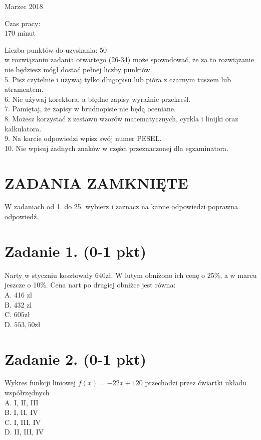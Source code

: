 \documentclass[10pt]{article}
\begin{document}
Marzec 2018

Czas pracy:\\
170 minut

Liczba punktów do uzyskania: 50\\
w rozwiązaniu zadania otwartego (26-34) może spowodować, że za to rozwiązanie nie będziesz mógł dostać pełnej liczby punktów.\\
5. Pisz czytelnie i używaj tylko długopisu lub pióra z czarnym tuszem lub atramentem.\\
6. Nie używaj korektora, a błędne zapisy wyraźnie przekreśl.\\
7. Pamiętaj, że zapisy w brudnopisie nie będą oceniane.\\
8. Możesz korzystać z zestawu wzorów matematycznych, cyrkla i linijki oraz kalkulatora.\\
9. Na karcie odpowiedzi wpisz swój numer PESEL.\\
10. Nie wpisuj żadnych znaków w części przeznaczonej dla egzaminatora.

\section*{ZADANIA ZAMKNIĘTE}
W zadaniach od 1. do 25. wybierz i zaznacz na karcie odpowiedzi poprawna odpowiedź.

\section*{Zadanie 1. (0-1 pkt)}
Narty w styczniu kosztowały \(640 \mathrm{zł}\). W lutym obniżono ich cenę o \(25 \%\), a w marcu jeszcze o 10\%. Cena nart po drugiej obniżce jest równa:\\
A. 416 zl\\
B. 432 zl\\
C. \(605 \mathrm{zł}\)\\
D. \(553,50 \mathrm{zł}\)

\section*{Zadanie 2. (0-1 pkt)}
Wykres funkcji liniowej \(f(x)=-22 x+120\) przechodzi przez ćwiartki układu współrzędnych\\
A. I, II, III\\
B. I, II, IV\\
C. I, III, IV\\
D. II, III, IV
\end{document}
